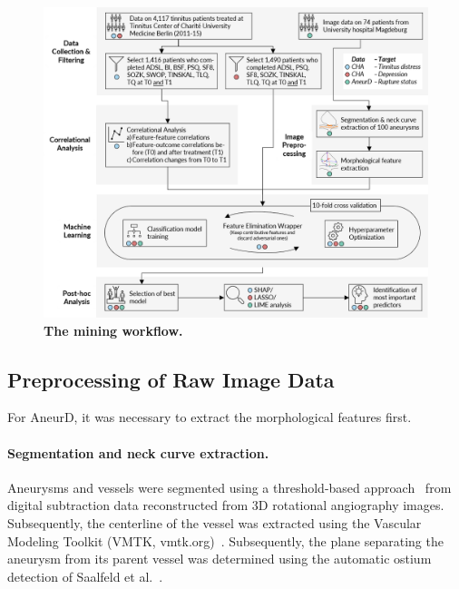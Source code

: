 \documentclass[
  oneside]{book}
\begin{document}
\begin{figure}[h]

{\centering \includegraphics[width=1\linewidth]{figures/09-iml-workflow-cropped} 

}

\caption{\textbf{The mining workflow.}}\label{fig:09-iml-workflow-cropped}
\end{figure}

\hypertarget{preprocessing-of-raw-image-data}{%
\subsection{Preprocessing of Raw Image Data}\label{preprocessing-of-raw-image-data}}

For AneurD, it was necessary to extract the morphological features first.

\paragraph*{Segmentation and neck curve extraction.}

Aneurysms and vessels were segmented using a threshold-based approach~\autocite{Glasser2015} from digital subtraction data reconstructed from 3D rotational angiography images.
Subsequently, the centerline of the vessel was extracted using the Vascular Modeling Toolkit (VMTK, vmtk.org)~\autocite{Antiga2008}.
Subsequently, the plane separating the aneurysm from its parent vessel was determined using the automatic ostium detection of Saalfeld et al.~\autocite{Saalfeld2018}.
\end{document}
